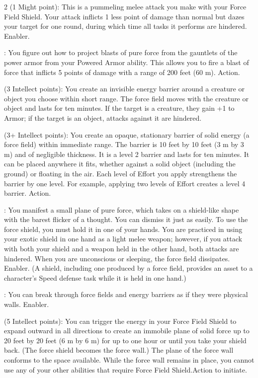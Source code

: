 \begin{multicols}{2}
 (1 Might point): This is a pummeling melee attack you make with your Force Field Shield. Your attack inflicts 1 less point of damage than normal but dazes your target for one round, during which time all tasks it performs are hindered. Enabler. 
 
: You figure out how to project blasts of pure force from the gauntlets of the power armor from your Powered Armor ability. This allows you to fire a blast of force that inflicts 5 points of damage with a range of 200 feet
(60 m). Action. 
 
 (3 Intellect points): You create an invisible energy barrier around a creature or object you choose within short range. The force field moves with the creature or object and lasts for ten minutes. If the target is a creature, they gain +1 to Armor; if the target is an object, attacks against it are hindered.
 
 (3+ Intellect points): You create an opaque, stationary barrier of solid energy (a force field) within immediate range. The barrier is 10 feet by 10 feet (3 m by 3 m) and of negligible thickness. It is a level 2 barrier and lasts for ten minutes. It can be placed anywhere it fits, whether against a solid object (including the ground) or floating in the air. Each level of Effort you apply strengthens the barrier by one level. For example, applying two levels of Effort creates a level 4 barrier. Action. 
 
: You manifest a small plane of pure force, which takes on a shield-like shape with the barest flicker of a thought. You can dismiss it just as easily. To use the force shield, you must hold it in one of your hands. You are practiced in using your exotic shield in one hand as a light melee weapon; however, if you attack with both your shield and a weapon held in the other hand, both attacks are hindered. When you are unconscious or sleeping, the force field dissipates. Enabler. (A shield, including one produced by a force field, provides an asset to a character’s Speed defense task while it is held in one hand.)
 
: You can break through force fields and energy barriers as if they were physical walls. Enabler. 
 
 (5 Intellect points): You can trigger the energy in your Force Field Shield to expand outward in all directions to create an immobile plane of solid force up to 20 feet by 20 feet (6 m by 6 m) for up to one hour or until you take your shield back. (The force shield becomes the force wall.) The plane of the force wall conforms to the space available. While the force wall remains in place, you cannot use any of your other abilities that require Force Field Shield.Action to initiate. 
 

\end{multicols}
